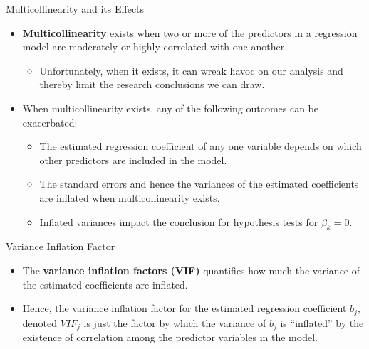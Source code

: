 \documentclass[
  ignorenonframetext,
]{beamer}
\providecommand{\tightlist}{%
  \setlength{\itemsep}{0pt}\setlength{\parskip}{0pt}}
\begin{document}
\begin{frame}{Multicollinearity and its Effects}
\protect\hypertarget{multicollinearity-and-its-effects}{}
\begin{itemize}
\item
  \textbf{Multicollinearity} exists when two or more of the predictors
  in a regression model are moderately or highly correlated with one
  another.

  \begin{itemize}
  \tightlist
  \item
    Unfortunately, when it exists, it can wreak havoc on our analysis
    and thereby limit the research conclusions we can draw.
  \end{itemize}
\item
  When multicollinearity exists, any of the following outcomes can be
  exacerbated:

  \begin{itemize}
  \tightlist
  \item
    The estimated regression coefficient of any one variable depends on
    which other predictors are included in the model.
  \item
    The standard errors and hence the variances of the estimated
    coefficients are inflated when multicollinearity exists.
  \item
    Inflated variances impact the conclusion for hypothesis tests for
    \(\beta_k = 0\).
  \end{itemize}
\end{itemize}
\end{frame}

\begin{frame}{Variance Inflation Factor}
\protect\hypertarget{variance-inflation-factor}{}
\begin{itemize}
\item
  The \textbf{variance inflation factors (VIF)} quantifies how much the
  variance of the estimated coefficients are inflated.
\item
  Hence, the variance inflation factor for the estimated regression
  coefficient \(b_j\), denoted \(VIF_j\) is just the factor by which the
  variance of \(b_j\) is ``inflated'' by the existence of correlation
  among the predictor variables in the model.
\end{itemize}
\end{frame}
\end{document}

